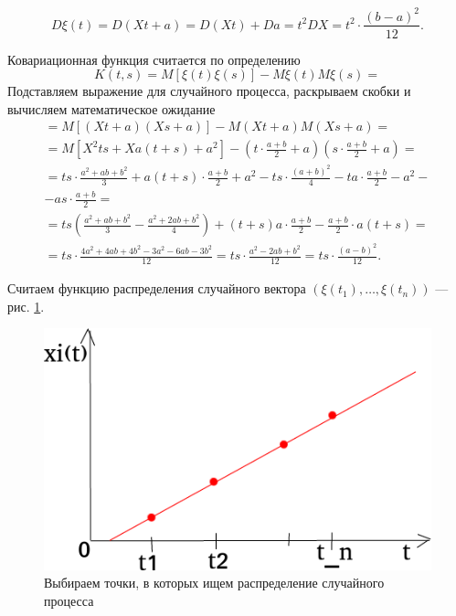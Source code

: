 $$D \xi \left( t \right) =
  D \left( Xt + a \right) =
  D \left( Xt \right) + Da =
  t^2 DX =
  t^2 \cdot \frac{ \left( b - a \right)^2}{12}.$$

Ковариационная функция считается по определению
$$K \left( t, s \right) =
  M \left[ \xi \left( t \right) \xi \left( s \right) \right] -
  M \xi \left( t \right) M \xi \left( s \right) =$$
Подставляем выражение для случайного процесса, раскрываем скобки и вычисляем математическое ожидание
\begin{equation*}
  \begin{split}
    = M \left[ \left( Xt + a \right) \left( Xs + a \right) \right] -
    M \left( Xt + a \right) M \left( Xs + a \right) = \\
    = M \left[ X^2 ts + Xa \left(t + s \right) + a^2 \right] -
    \left( t \cdot \frac{a + b}{2} + a \right) \left( s \cdot \frac{a + b}{2} + a \right) = \\
    = ts \cdot \frac{a^2 + ab + b^2}{3} + a \left( t + s \right) \cdot \frac{a + b}{2} + a^2 -
    ts \cdot \frac{ \left( a + b \right)^2}{4} - ta \cdot \frac{a + b}{2} - a^2 - \\
    - as \cdot \frac{a + b}{2} = \\
    = ts \left( \frac{a^2 + ab + b^2}{3} - \frac{a^2 + 2ab + b^2}{4} \right) +
    \left(t + s \right) a \cdot \frac{a + b}{2} - \frac{a + b}{2} \cdot a \left( t + s \right) = \\
    = ts \cdot \frac{4a^2 + 4ab + 4b^2 - 3a^2 - 6ab - 3b^2}{12} =
    ts \cdot \frac{a^2 - 2ab + b^2}{12} =
    ts \cdot \frac{ \left( a - b \right)^2}{12}.
  \end{split}
\end{equation*}

Считаем функцию распределения случайного вектора
$ \left( \xi \left( t_1 \right), \dotsc, \xi \left( t_n \right) \right) $ --- рис. \ref{fig:2121}.

\begin{figure}[h!]
 \centering
 \includegraphics[width=.5\textwidth]{./pictures/2_12_1.png}
 \caption{Выбираем точки, в которых ищем распределение случайного процесса}
 \label{fig:2121}
\end{figure}

